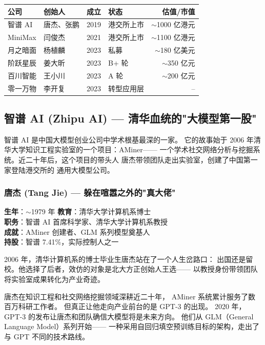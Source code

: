 \begin{keybox}[六小虎一览（2026 年 3 月）]
\begin{tabular}{llllr}
\textbf{公司} & \textbf{创始人} & \textbf{成立} & \textbf{状态} & \textbf{估值/市值} \\
\hline
智谱 AI & 唐杰、张鹏 & 2019 & 港交所上市 & $\sim$1000 亿港元 \\
MiniMax & 闫俊杰 & 2021 & 港交所上市 & $\sim$1100 亿港元 \\
月之暗面 & 杨植麟 & 2023 & 私募 & $\sim$180 亿美元 \\
阶跃星辰 & 姜大昕 & 2023 & B+ 轮 & $\sim$350 亿元 \\
百川智能 & 王小川 & 2023 & A 轮 & $\sim$200 亿元 \\
零一万物 & 李开复 & 2023 & 转型应用层 & -- \\
\end{tabular}
\end{keybox}


\subsection{智谱 AI (Zhipu AI) — 清华血统的"大模型第一股"}

智谱 AI 是中国大模型创业公司中学术根基最深的一家。
它的故事始于 2006 年清华大学知识工程实验室的一个项目：AMiner——
一个学术社交网络分析与挖掘系统。近二十年后，这个项目的带头人
唐杰带领团队走出实验室，创建了中国第一家登陆港交所的
通用大模型公司。

\subsubsection{唐杰 (Tang Jie) — 躲在喧嚣之外的"真大佬"}

\begin{keybox}[人物档案：唐杰]
\textbf{生年}：$\sim$1979 年 \quad \textbf{教育}：清华大学计算机系博士 \\
\textbf{职务}：智谱 AI 首席科学家、清华大学计算机系教授 \\
\textbf{成就}：AMiner 创建者、GLM 系列模型奠基人 \\
\textbf{持股}：智谱 7.41\%，实际控制人之一
\end{keybox}

2006 年，清华计算机系的博士毕业生唐杰站在了一个人生岔路口：
出国还是留校。他选择了后者，效仿的对象是北大方正创始人王选——
以教授身份带领团队将实验室成果转化为产业奇迹。

唐杰在知识工程和社交网络挖掘领域深耕近二十年，
AMiner 系统累计服务了数百万科研工作者。
但真正让他走向产业前台的是 GPT-3 的出现。
2020 年，GPT-3 的发布让唐杰和团队确信大模型将是未来方向。
他们从 GLM（General Language Model）系列开始——
一种采用自回归填空预训练目标的架构，走出了与 GPT 不同的技术路线。

